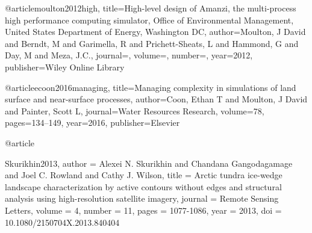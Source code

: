 \begin{thebibliography}{}
@article{moulton2012high,
  title={High-level design of Amanzi, the multi-process high performance
computing simulator, Office of Environmental Management, United States Department
of Energy, Washington DC},
  author={Moulton, J David and Berndt, M and Garimella, R and Prichett-Sheats, L and Hammond, G and Day, M and Meza, J.C.},
  journal={},
  volume={},
  number={},
  year={2012},
  publisher={Wiley Online Library}
}


@article{ecoon2016managing,
  title={Managing complexity in simulations of land surface and near-surface processes},
  author={Coon, Ethan T and Moulton, J David and Painter, Scott L},
  journal={Water Resources Research},
  volume={78},
  pages={134--149},
  year={2016},
  publisher={Elsevier}
}

@article{Skurikhin2013,
author = {Alexei N. Skurikhin and Chandana Gangodagamage and Joel C. Rowland and Cathy J. Wilson},
title = {Arctic tundra ice-wedge landscape characterization by active contours without edges and structural analysis using high-resolution satellite imagery},
journal = {Remote Sensing Letters},
volume = {4},
number = {11},
pages = {1077-1086},
year = {2013},
doi = {10.1080/2150704X.2013.840404}

}


\end{thebibliography}







